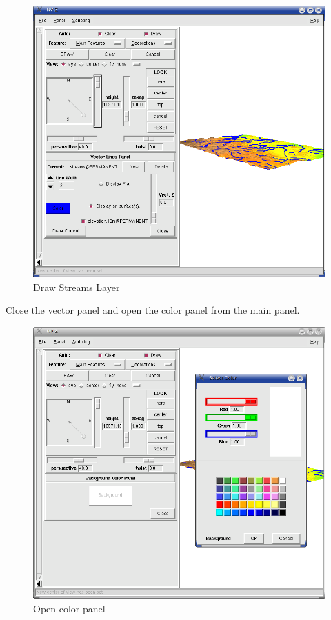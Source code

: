 \begin{figure}[htbp]
   \centering
   \includegraphics[scale=0.2]{nviz009.png}
   \caption{Draw Streams Layer}
   \label{fig:nviz009}
\end{figure}

Close the vector panel and open the color panel from the main panel.

\begin{figure}[htbp]
   \centering
   \includegraphics[scale=0.2]{nviz010.png}
   \caption{Open color panel}
   \label{fig:nviz010}
\end{figure}

